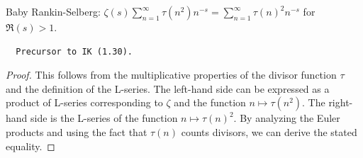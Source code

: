 \begin{theorem}
\label{zeta_mul_tau_square_eq}
\leanok
Baby Rankin-Selberg: $\zeta(s)\sum_{n=1}^{\infty}\tau(n^2)n^{-s} = \sum_{n=1}^{\infty}\tau(n)^2 n^{-s}$ for $\Re(s) > 1$.
  \begin{verbatim}
  Precursor to IK (1.30).
  \end{verbatim}
\end{theorem}
\begin{proof}
\leanok
This follows from the multiplicative properties of the divisor function $\tau$ and the definition of the L-series. The left-hand side can be expressed as a product of L-series corresponding to $\zeta$ and the function $n \mapsto \tau(n^2)$. The right-hand side is the L-series of the function $n \mapsto \tau(n)^2$. By analyzing the Euler products and using the fact that $\tau(n)$ counts divisors, we can derive the stated equality.
\end{proof}
